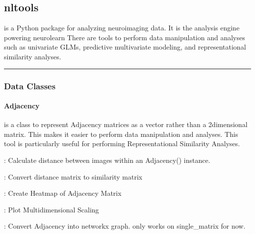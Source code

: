 \documentclass[letterpaper,10pt,english]{sphinxmanual}
\begin{document}
\subsection{nltools}
\label{\detokenize{content/Glossary:nltools}}
 is a Python package for analyzing neuroimaging data. It is the analysis engine powering neuro\sphinxhyphen{}learn There are tools to perform data manipulation and analyses such as univariate GLMs, predictive multivariate modeling, and representational similarity analyses.


\bigskip\hrule\bigskip



\subsubsection{Data Classes}
\label{\detokenize{content/Glossary:data-classes}}

\paragraph{Adjacency}
\label{\detokenize{content/Glossary:adjacency}}
 is a class to represent Adjacency matrices as a vector rather than a 2\sphinxhyphen{}dimensional matrix. This makes it easier to perform data manipulation and analyses. This tool is particularly useful for performing Representational Similarity Analyses.

: Calculate distance between images within an Adjacency() instance.

: Convert distance matrix to similarity matrix

: Create Heatmap of Adjacency Matrix

: Plot Multidimensional Scaling

: Convert Adjacency into networkx graph. only works on single\_matrix for now.
\end{document}
